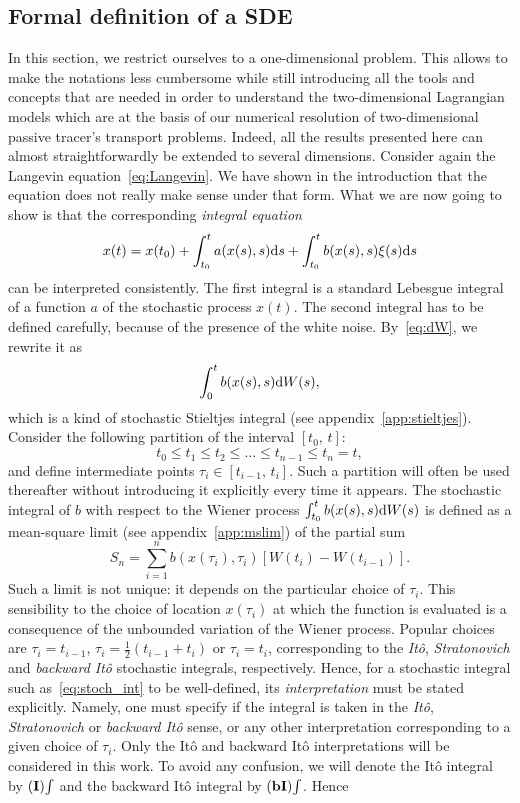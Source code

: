 \subsection{Formal definition of a SDE}
In this section, we restrict ourselves to a one-dimensional problem. This allows to make the notations less cumbersome while still introducing all the tools and concepts that are needed in order to understand the two-dimensional Lagrangian models which are at the basis of our numerical resolution of two-dimensional passive tracer's transport problems. Indeed, all the results presented here can almost straightforwardly be extended to several dimensions. Consider again the Langevin equation~\eqref{eq:Langevin}. We have shown in the introduction that the equation does not really make sense under that form. What we are now going to show is that the corresponding \textit{integral equation} 
\begin{equation} \label{eq:SDEint_xsi}
	x(t) = x(t_0) + \int_{t_0}^t a(x(s),s) \rm ds + \int_{t_0}^t b(x(s),s) \xi(s) \rm ds
\end{equation}
can be interpreted consistently. The first integral is a standard Lebesgue integral of a function $a$ of the stochastic process $x(t)$. The second integral has to be defined carefully, because of the presence of the white noise. By~\eqref{eq:dW}, we rewrite it as
\begin{equation} \label{eq:stoch_int}
	\int_0^t b(x(s),s) \rm dW(s),
\end{equation}
which is a kind of stochastic Stieltjes integral (see appendix~\ref{app:stieltjes}). Consider the following partition of the interval $[t_0,\,t]$:
\begin{equation}
	t_0 \le t_1 \le t_2 \le \dots \le t_{n-1} \le t_n = t,
\end{equation}
and define intermediate points $\tau_i \in [t_{i-1},\, t_i]$. Such a partition will often be used thereafter without introducing it explicitly every time it appears. The stochastic integral of $b$ with respect to the Wiener process $\int_{t_0}^t b(x(s),s) \rm dW(s)$ is defined as a mean-square limit (see appendix~\ref{app:mslim}) of the partial sum
\begin{equation}
	S_n = \sum_{i=1}^n b(x(\tau_i),\tau_i) [W(t_i)-W(t_{i-1})].
\end{equation}
Such a limit is not unique: it depends on the particular choice of $\tau_i$. This sensibility to the choice of location $x(\tau_i)$ at which the function is evaluated is a consequence of the unbounded variation of the Wiener process. Popular choices are $\tau_i = t_{i-1}$, $\tau_i = \frac{1}{2}(t_{i-1}+t_i)$ or $\tau_i = t_i$, corresponding to the \textit{Itô}, \textit{Stratonovich} and \textit{backward Itô} stochastic integrals, respectively. Hence, for a stochastic integral such as~\eqref{eq:stoch_int} to be well-defined, its \textit{interpretation} must be stated explicitly. Namely, one must specify if the integral is taken in the \textit{Itô}, \textit{Stratonovich} or \textit{backward Itô} sense, or any other interpretation corresponding to a given choice of $\tau_i$. Only the Itô and backward Itô interpretations will be considered in this work. To avoid any confusion, we will denote the Itô integral by $\I\int$ and the backward Itô integral by $\bI\int$. Hence
